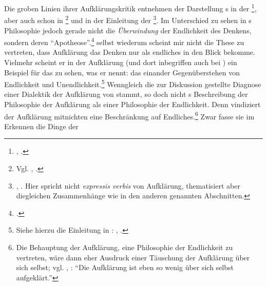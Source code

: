 Die groben Linien ihrer Aufklärungskritik entnehmen  der
Darstellung s in der \footnote{\cite[Vgl.][486--547]{Hegel:PhaenomenologiedesGeistes1980},
\cite[][IX: 292.11--323.21]{Hegel:GesammelteWerke}.}, aber auch schon in
\footnote{Vgl.
\cite{Hegel:GlaubenundWissenoderdieReflexionsphilosophiederSubjektivitaetinderVollstaendigkeitihrerFormenalsKantischeJacobischeundFichteschePhilosophie1968},
\cite[][IV: 315.5--324.33]{Hegel:GesammelteWerke}.} und in der Einleitung der
\footnote{\cite[Vgl.][\S\S~5--21]{Hegel:GrundlinienderPhilosophiedesRechts1970},
\cite[][XIV,1: 32.11--42.6]{Hegel:GesammelteWerke}. Hier spricht
 nicht \emph{expressis verbis} von Aufklärung,
thematisiert aber diegleichen Zusammenhänge wie in den anderen genannten
Abschnitten.}. Im Unterschied zu  sehen
 in
s Philosophie jedoch gerade nicht die
\emph{Überwindung} der Endlichkeit des Denkens, sondern deren
\enquote{Apotheose}.\footcite[Vgl.][41]{Horkheimer:DialektikderAufklaerung1997}
 selbst wiederum scheint mir nicht die These
zu vertreten, dass Aufklärung das Denken nur als endliches in den Blick bekomme.
Vielmehr scheint er in der Aufklärung (und dort inbegriffen auch bei
) ein Beispiel für das zu sehen, was er
 nennt: das einander Gegenüberstehen von
Endlichkeit und Unendlichkeit.\footnote{Siehe hierzu die Einleitung in
:
\cite[][3--21]{Hegel:GlaubenundWissenoderdieReflexionsphilosophiederSubjektivitaetinderVollstaendigkeitihrerFormenalsKantischeJacobischeundFichteschePhilosophie1968},
\cite[][IV: 315--324]{Hegel:GesammelteWerke}.} Wenngleich die zur Diskussion
gestellte Diagnose einer Dialektik der Aufklärung von
 stammt, so doch nicht
s Beschreibung der Philosophie der Aufklärung als
einer Philosophie der Endlichkeit. Denn 
vindiziert der Aufklärung mitnichten eine Beschränkung auf
Endliches.\footnote{Die Behauptung der Aufklärung, eine Philosophie der
Endlichkeit zu vertreten, wäre dann eher Ausdruck einer Täuschung der Aufklärung
über sich selbst; vgl. \cite{Hegel:PhaenomenologiedesGeistes1980}, \cite[][IX:
306.28--29]{Hegel:GesammelteWerke}: \enquote{Die Aufklärung {\punkt} ist eben so
wenig über sich selbst aufgeklärt.}} Zwar fasse sie im Erkennen die Dinge der
